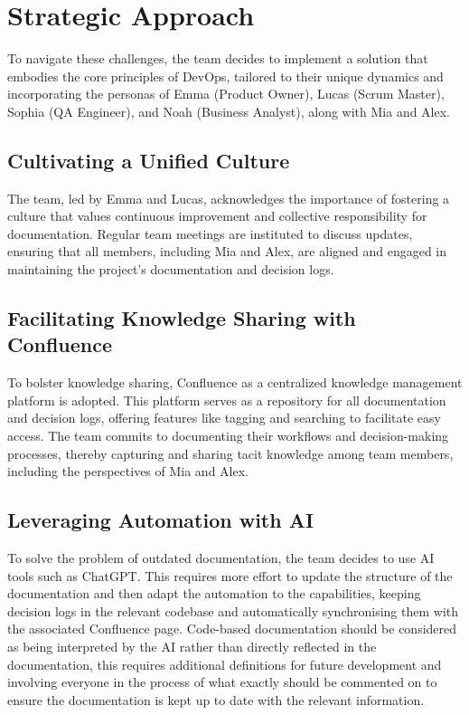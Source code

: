 \section{Strategic Approach}
To navigate these challenges, the team decides to implement a solution that embodies the core principles of DevOps, tailored to their unique dynamics and incorporating the personas of Emma (Product Owner), Lucas (Scrum Master), Sophia (QA Engineer), and Noah (Business Analyst), along with Mia and Alex.

\subsection{Cultivating a Unified Culture}
The team, led by Emma and Lucas, acknowledges the importance of fostering a culture that values continuous improvement and collective responsibility for documentation. Regular team meetings are instituted to discuss updates, ensuring that all members, including Mia and Alex, are aligned and engaged in maintaining the project's documentation and decision logs.

\subsection{Facilitating Knowledge Sharing with Confluence}
To bolster knowledge sharing, Confluence as a centralized knowledge management platform is adopted. This platform serves as a repository for all documentation and decision logs, offering features like tagging and searching to facilitate easy access. The team commits to documenting their workflows and decision-making processes, thereby capturing and sharing tacit knowledge among team members, including the perspectives of Mia and Alex.

\subsection{Leveraging Automation with AI}
To solve the problem of outdated documentation, the team decides to use AI tools such as ChatGPT. This requires more effort to update the structure of the documentation and then adapt the automation to the capabilities, keeping decision logs in the relevant codebase and automatically synchronising them with the associated Confluence page. Code-based documentation should be considered as being interpreted by the AI rather than directly reflected in the documentation, this requires additional definitions for future development and involving everyone in the process of what exactly should be commented on to ensure the documentation is kept up to date with the relevant information.

